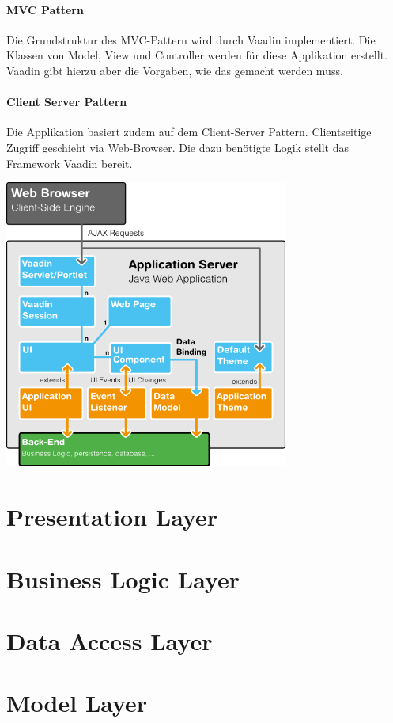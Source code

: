 \documentclass[a4paper]{scrreprt}
\begin{document}
\paragraph{MVC Pattern}
Die Grundstruktur des MVC-Pattern wird durch Vaadin implementiert. Die Klassen von Model, View und Controller werden für diese Applikation erstellt. Vaadin gibt hierzu aber die Vorgaben, wie das gemacht werden muss.


\paragraph{Client Server Pattern}
Die Applikation basiert zudem auf dem Client-Server Pattern. Clientseitige Zugriff geschieht via Web-Browser. Die dazu benötigte Logik stellt das Framework Vaadin bereit.

\bigskip

\includegraphics[width=0.7\textwidth]{img/vaadin-arch.png}


\section{Presentation Layer}



\section{Business Logic Layer}


\section{Data Access Layer}



\section{Model Layer}
\end{document}
